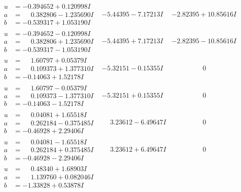 \documentclass[1p]{elsarticle_modified}
\theoremstyle{definition}
\begin{document}
$$\begin{array}{c|c|c}
\begin{aligned}
u &= -0.394652 + 0.120998 I \\
a &= \phantom{-}0.382806 - 1.235690 I \\
b &= -0.539317 + 1.053190 I\end{aligned}
 & -5.44395 - 7.17213 I & -2.82395 + 10.85616 I \\ \hline\begin{aligned}
u &= -0.394652 - 0.120998 I \\
a &= \phantom{-}0.382806 + 1.235690 I \\
b &= -0.539317 - 1.053190 I\end{aligned}
 & -5.44395 + 7.17213 I & -2.82395 - 10.85616 I \\ \hline\begin{aligned}
u &= \phantom{-}1.60797 + 0.05379 I \\
a &= \phantom{-}0.109373 + 1.377310 I \\
b &= -0.14063 + 1.52178 I\end{aligned}
 & -5.32151 - 0.15355 I & \phantom{-0.000000 } 0 \\ \hline\begin{aligned}
u &= \phantom{-}1.60797 - 0.05379 I \\
a &= \phantom{-}0.109373 - 1.377310 I \\
b &= -0.14063 - 1.52178 I\end{aligned}
 & -5.32151 + 0.15355 I & \phantom{-0.000000 } 0 \\ \hline\begin{aligned}
u &= \phantom{-}0.04081 + 1.65518 I \\
a &= \phantom{-}0.262184 - 0.375485 I \\
b &= -0.46928 + 2.29406 I\end{aligned}
 & \phantom{-}3.23612 - 6.49647 I & \phantom{-0.000000 } 0 \\ \hline\begin{aligned}
u &= \phantom{-}0.04081 - 1.65518 I \\
a &= \phantom{-}0.262184 + 0.375485 I \\
b &= -0.46928 - 2.29406 I\end{aligned}
 & \phantom{-}3.23612 + 6.49647 I & \phantom{-0.000000 } 0 \\ \hline\begin{aligned}
u &= \phantom{-}0.48340 + 1.68903 I \\
a &= \phantom{-}1.139760 + 0.082046 I \\
b &= -1.33828 + 0.53878 I\end{aligned}

\end{array}$$
\end{document}

